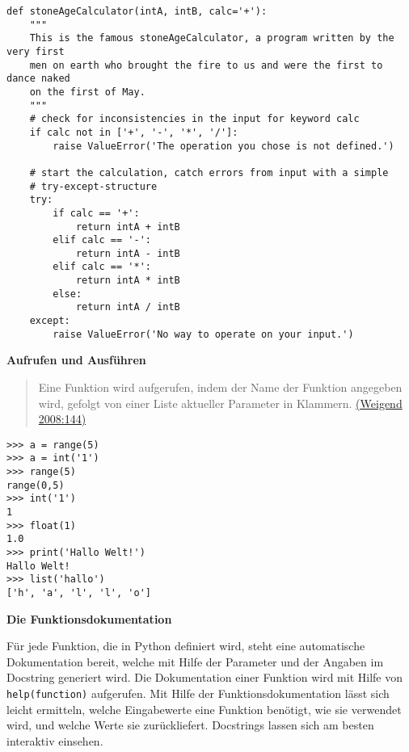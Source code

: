 \begin{verbatim}
def stoneAgeCalculator(intA, intB, calc='+'):
    """
    This is the famous stoneAgeCalculator, a program written by the very first
    men on earth who brought the fire to us and were the first to dance naked
    on the first of May.
    """
    # check for inconsistencies in the input for keyword calc
    if calc not in ['+', '-', '*', '/']:
        raise ValueError('The operation you chose is not defined.')

    # start the calculation, catch errors from input with a simple
    # try-except-structure
    try:
        if calc == '+':
            return intA + intB
        elif calc == '-':
            return intA - intB
        elif calc == '*':
            return intA * intB
        else:
            return intA / intB
    except:
        raise ValueError('No way to operate on your input.')
\end{verbatim}




\vspace{0.5cm}\par\noindent\textbf{Aufrufen und Ausführen}\vspace{0.5cm}

\begin{quote}
Eine Funktion wird aufgerufen, indem der Name der Funktion angegeben
wird, gefolgt von einer Liste aktueller Parameter in Klammern.
\href{http://bibliography.lingpy.org?key=Weigend2008}{(Weigend
2008:144)}
\end{quote}

\begin{verbatim}
>>> a = range(5)
>>> a = int('1')
>>> range(5)
range(0,5)
>>> int('1')
1
>>> float(1)
1.0
>>> print('Hallo Welt!')
Hallo Welt!
>>> list('hallo')
['h', 'a', 'l', 'l', 'o']
\end{verbatim}




\vspace{0.5cm}\par\noindent\textbf{Die Funktionsdokumentation}\vspace{0.5cm}

Für jede Funktion, die in Python definiert wird, steht eine automatische
Dokumentation bereit, welche mit Hilfe der Parameter und der Angaben im
Docstring generiert wird. Die Dokumentation einer Funktion wird mit
Hilfe von \texttt{help(function)} aufgerufen. Mit Hilfe der
Funktionsdokumentation lässt sich leicht ermitteln, welche Eingabewerte
eine Funktion benötigt, wie sie verwendet wird, und welche Werte sie
zurückliefert. Docstrings lassen sich am besten interaktiv einsehen.



